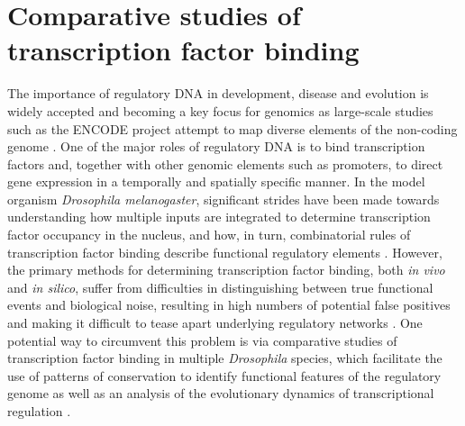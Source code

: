 \section{Comparative studies of transcription factor binding}
The importance of regulatory DNA in development, disease and evolution is widely accepted and becoming a key focus for genomics as large-scale studies such as the ENCODE project attempt to map diverse elements of the non-coding genome \citep{dunham_integrated_2012,gordon_tempo_2012,neph_expansive_2012,wray_evolutionary_2007}. One of the major roles of regulatory DNA is to bind transcription factors and, together with other genomic elements such as promoters, to direct gene expression in a temporally and spatially specific manner. In the model organism \emph{Drosophila melanogaster}, significant strides have been made towards understanding how multiple inputs are integrated to determine transcription factor occupancy in the nucleus, and how, in turn, combinatorial rules of transcription factor binding describe functional regulatory elements \citep{kaplan_quantitative_2011,li_role_2011,zinzen_combinatorial_2009}. However, the primary methods for determining transcription factor binding, both \emph{in vivo} and \emph{in silico}, suffer from difficulties in distinguishing between true functional events and biological noise, resulting in high numbers of potential false positives and making it difficult to tease apart underlying regulatory networks \citep{biggin_animal_2011,fisher_dna_2012,macarthur_developmental_2009}. One potential way to circumvent this problem is via comparative studies of transcription factor binding in multiple \emph{Drosophila} species, which facilitate the use of patterns of conservation to identify functional features of the regulatory genome as well as an analysis of the evolutionary dynamics of transcriptional regulation \citep{ludwig_functional_2002}.

